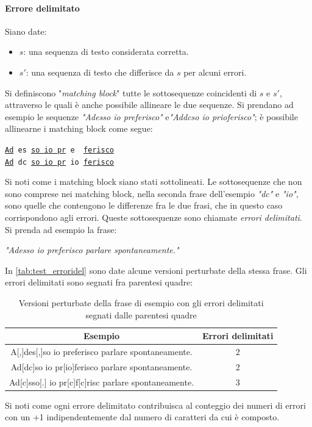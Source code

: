 \paragraph{Errore delimitato} Siano date:
\begin{itemize}
\item $s$: una sequenza di testo considerata corretta.
\item $s\prime$: una sequenza di testo che differisce da $s$ per alcuni errori. 
\end{itemize}
Si definiscono "\textit{matching block}" tutte le sottosequenze coincidenti di $s$ e $s\prime$, attraverso le quali è anche possibile allineare le due sequenze. Si prendano ad esempio le sequenze \textit{"Adesso io preferisco"} e\textit{"Addcso io prioferisco"}; è possibile allinearne i matching block come segue:
\begin{center}
\noindent
\texttt{\underline{Ad} es \underline{so io pr} e\ \ \underline{ferisco}}\\
\texttt{\underline{Ad} dc \underline{so io pr} io \underline{ferisco}}
\end{center}
Si noti come i matching block siano stati sottolineati. Le sottosequenze che non sono comprese nei matching block, nella seconda frase dell'esempio \textit{"dc"} e \textit{"io"}, sono quelle che contengono le differenze fra le due frasi, che in questo caso corrispondono agli errori. Queste sottosequenze sono chiamate \textit{errori delimitati}.\\
Si prenda ad esempio la frase:
\begin{center}
\textit{"Adesso io preferisco parlare spontaneamente."}
\end{center}
In \autoref{tab:test_erroridel} sono date alcune versioni perturbate della stessa frase. Gli errori delimitati sono segnati fra parentesi quadre:

\begin{table}[H]
\centering
\begin{tabular}{cc}
\textbf{Esempio} & \textbf{Errori delimitati}\\
\hline
A[,]des[,]so io preferisco parlare spontaneamente. & 2 \\
Ad[dc]so io pr[io]ferisco parlare spontaneamente. & 2 \\
Ad[c]sso[.] io pr[c]f[c]risc parlare spontaneamente. & 3\\
\end{tabular}
\caption{Versioni perturbate della frase di esempio con gli errori delimitati segnati dalle parentesi quadre}
\label{tab:test_erroridel}
\end{table}
\noindent
Si noti come ogni errore delimitato contribuisca al conteggio dei numeri di errori con un +1 indipendentemente dal numero di caratteri da cui è composto.

